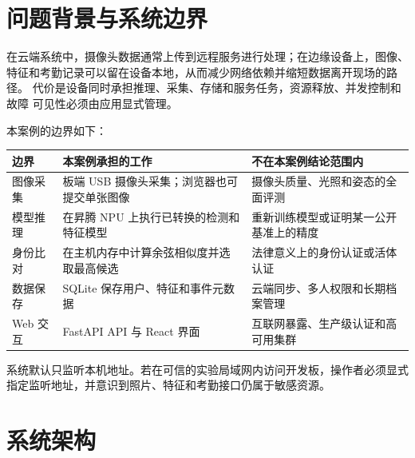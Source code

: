 \section{问题背景与系统边界}\label{ux95eeux9898ux80ccux666fux4e0eux7cfbux7edfux8fb9ux754c}

在云端系统中，摄像头数据通常上传到远程服务进行处理；在边缘设备上，图像、
特征和考勤记录可以留在设备本地，从而减少网络依赖并缩短数据离开现场的路径。
代价是设备同时承担推理、采集、存储和服务任务，资源释放、并发控制和故障
可见性必须由应用显式管理。

本案例的边界如下：

\begin{longtable}[]{@{}
  >{\raggedright\arraybackslash}p{}
  >{\raggedright\arraybackslash}p{}
  >{\raggedright\arraybackslash}p{}@{}}
\toprule\noalign{}
\begin{minipage}[b]{\linewidth}\raggedright
边界
\end{minipage} & \begin{minipage}[b]{\linewidth}\raggedright
本案例承担的工作
\end{minipage} & \begin{minipage}[b]{\linewidth}\raggedright
不在本案例结论范围内
\end{minipage} \\
\midrule\noalign{}
\endhead
\bottomrule\noalign{}
\endlastfoot
图像采集 & 板端 USB 摄像头采集；浏览器也可提交单张图像 &
摄像头质量、光照和姿态的全面评测 \\
模型推理 & 在昇腾 NPU 上执行已转换的检测和特征模型 &
重新训练模型或证明某一公开基准上的精度 \\
身份比对 & 在主机内存中计算余弦相似度并选取最高候选 &
法律意义上的身份认证或活体认证 \\
数据保存 & SQLite 保存用户、特征和事件元数据 &
云端同步、多人权限和长期档案管理 \\
Web 交互 & FastAPI API 与 React 界面 &
互联网暴露、生产级认证和高可用集群 \\
\end{longtable}

系统默认只监听本机地址。若在可信的实验局域网内访问开发板，操作者必须显式
指定监听地址，并意识到照片、特征和考勤接口仍属于敏感资源。

\section{系统架构}\label{ux7cfbux7edfux67b6ux6784}

